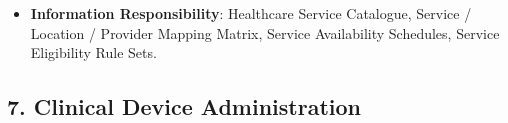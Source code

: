\begin{itemize}
\begin{itemize}
\begin{itemize}
\end{itemize}


\item 
\textbf{Feature: Operating Schedule Specification}:


\begin{itemize}

\item 
\emph{Function}: \texttt{} — Governs regular operating hours, emergency intake availability, and seasonal clinic schedules.



\item 
\emph{Exposed Service}: \texttt{} — Discloses operational intake hours and open status.



\end{itemize}


\item 
\textbf{Feature: Eligibility \& Catchment Specification}:


\begin{itemize}

\item 
\emph{Function}: \texttt{} — Configures catchment criteria, age thresholds, referral requirements, and clinical indications for service access.



\item 
\emph{Exposed Service}: \texttt{} — Evaluates referral eligibility for intake coordinators.



\end{itemize}


\end{itemize}


\item 
\textbf{Information Responsibility}: Healthcare Service Catalogue, Service /\allowbreak{} Location /\allowbreak{} Provider Mapping Matrix, Service Availability Schedules, Service Eligibility Rule Sets.



\end{itemize}
\label{rad:em:187}

\par\smallskip
{}\label{rad:em:189}
\subsection*{7. Clinical Device Administration}
\label{rad:em:191}

